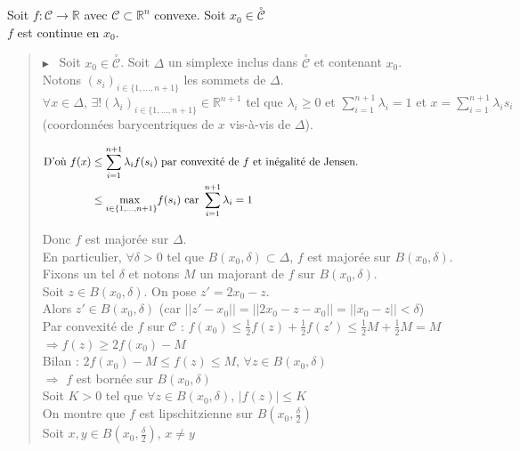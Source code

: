 \documentclass[12pt,a4paper]{article}
\newcommand{\propriete}[2]{%
    \begin{tcolorbox}[colback=white,colframe=green!25!white,title=\textbf{Propriété #1}, coltitle=black]
        #2
    \end{tcolorbox}
}
\newcommand{\preuve}[1]{%
    \begin{quote}
        $\blacktriangleright$~#1
    \end{quote}
}
\begin{document}
\propriete{}{
    Soit $f : \mathcal{C} \rightarrow \mathbb{R}$ avec $\mathcal{C} \subset \mathbb{R}^n$ convexe.
    Soit $x_0 \in \overset{\circ}{\mathcal{C}}$\\
    $f$ est continue en $x_0$.
}

\preuve{
    Soit $x_0 \in \overset{\circ}{\mathcal{C}}$.
Soit $\Delta$ un simplexe inclus dans $\overset{\circ}{\mathcal{C}}$ et contenant $x_0$.\\
Notons $(s_i)_{i \in \{1, \dots, n + 1\}}$ les sommets de $\Delta$.\\
$\forall x \in \Delta$, $\exists! (\lambda_i)_{i \in \{1, \dots, n + 1\}} \in \mathbb{R}^{n + 1}$ tel que $\lambda_i \geq 0$ et $\sum_{i=1}^{n + 1} \lambda_i = 1$ et $x = \sum_{i=1}^{n + 1} \lambda_i s_i$\\
(coordonnées barycentriques de $x$ vis-à-vis de $\Delta$).

\begin{align*}
    \text{D'où } f(x) &\leq \sum_{i=1}^{n + 1} \lambda_i f(s_i) \text{ par convexité de } f \text{ et inégalité de Jensen.}\hspace{14.5cm}\\
    & \leq \underset{i \in \{1, \dots, n + 1\}}{\text{max }} f(s_i) \text{ car } \sum_{i=1}^{n + 1} \lambda_i = 1
\end{align*}

Donc $f$ est majorée sur $\Delta$.\\
En particulier, $\forall \delta > 0$ tel que $B(x_0, \delta) \subset \Delta$, $f$ est majorée sur $B(x_0, \delta)$.\\

Fixons un tel $\delta$ et notons $M$ un majorant de $f$ sur $B(x_0, \delta)$.\\
Soit $z \in B(x_0, \delta)$. On pose $z' = 2x_0 - z$.\\
Alors $z' \in B(x_0, \delta)$ (car $||z' - x_0|| = ||2x_0 - z - x_0|| = ||x_0 - z|| < \delta$)\\

Par convexité de $f$ sur $\mathcal{C}$ : $f(x_0) \leq \frac{1}{2} f(z) + \frac{1}{2} f(z') \leq \frac{1}{2} M + \frac{1}{2} M = M$\\
$\Rightarrow f(z) \geq 2f(x_0) - M$\\
Bilan : $2f(x_0) - M \leq f(z) \leq M$, $\forall z \in B(x_0, \delta)$\\
$\Rightarrow$ $f$ est bornée sur $B(x_0, \delta)$\\

Soit $K > 0$ tel que $\forall z \in B(x_0, \delta)$, $|f(z)| \leq K$\\
On montre que $f$ est lipschitzienne sur $B(x_0, \frac{\delta}{2})$\\
Soit $x, y \in B(x_0, \frac{\delta}{2})$, $x \neq y$\\

}
\end{document}
